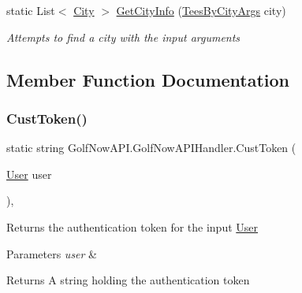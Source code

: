 \begin{DoxyCompactItemize}
static List$<$ \mbox{\hyperlink{class_golf_now_a_p_i_1_1_city}{City}} $>$ \mbox{\hyperlink{class_golf_now_a_p_i_1_1_golf_now_a_p_i_handler_a05c9ab04974f8a19c8d32f79e60be5a1}{Get\+City\+Info}} (\mbox{\hyperlink{class_golf_now_a_p_i_1_1_tees_by_city_args}{Tees\+By\+City\+Args}} city)
\begin{DoxyCompactList}\small\item\em Attempts to find a city with the input arguments \end{DoxyCompactList}\end{DoxyCompactItemize}


\subsection{Member Function Documentation}
\mbox{\label{class_golf_now_a_p_i_1_1_golf_now_a_p_i_handler_ae2f95c14f042ab3008642f30b0b93e36}} 
\subsubsection{\texorpdfstring{CustToken()}{CustToken()}}
{\footnotesize\ttfamily static string Golf\+Now\+A\+P\+I.\+Golf\+Now\+A\+P\+I\+Handler.\+Cust\+Token (\begin{DoxyParamCaption}\item[{\mbox{\hyperlink{class_golf_now_a_p_i_1_1_user}{User}}}]{user }\end{DoxyParamCaption})\hspace{0.3cm}{\ttfamily [inline]}, {\ttfamily [static]}}



Returns the authentication token for the input \mbox{\hyperlink{class_golf_now_a_p_i_1_1_user}{User}} 


\begin{DoxyParams}{Parameters}
{\em user} & \\
\hline
\end{DoxyParams}
\begin{DoxyReturn}{Returns}
A string holding the authentication token
\end{DoxyReturn}
\mbox{\label{class_golf_now_a_p_i_1_1_golf_now_a_p_i_handler_a0b8fc4a17e1a9a19354d6d3639351578}} 
